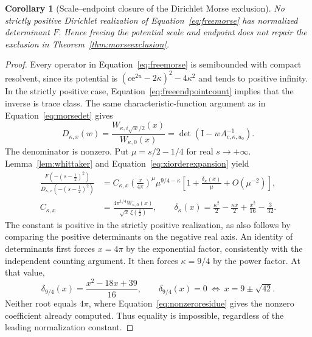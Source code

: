 \documentclass[11pt,letterpaper]{article}
\numberwithin{equation}{section}
\newtheorem{corollary}[theorem]{Corollary}
\theoremstyle{definition}
\theoremstyle{remark}
\newcommand{\Id}{\mathrm I}
\newcommand{\e}{\mathrm e}
\begin{document}
\begin{corollary}[Scale--endpoint closure of the Dirichlet Morse exclusion]
\label{cor:scaleendpointexclusion}
No strictly positive Dirichlet realization of Equation~\eqref{eq:freemorse} has normalized determinant $F$. Hence freeing the potential scale and endpoint does not repair the exclusion in Theorem~\ref{thm:morseexclusion}.
\end{corollary}
\begin{proof}
Every operator in Equation~\eqref{eq:freemorse} is semibounded with compact resolvent, since its potential is $(c\e^{2u}-2\kappa)^2-4\kappa^2$ and tends to positive infinity. In the strictly positive case, Equation~\eqref{eq:freeendpointcount} implies that the inverse is trace class. The same characteristic-function argument as in Equation~\eqref{eq:morsedet} gives
\begin{equation}
 D_{\kappa,x}(w)
 =\frac{W_{\kappa,i\sqrt w/2}(x)}{W_{\kappa,0}(x)}
 =\det(\Id-wA_{c,\kappa,u_0}^{-1}).
 \label{eq:freeendpointdet}
\end{equation}
The denominator is nonzero. Put $\mu=s/2-1/4$ for real $s\to+\infty$. Lemma~\ref{lem:whittaker} and Equation~\eqref{eq:xiorderexpansion} yield
\begin{align}
 \frac{F(-(s-\tfrac12)^2)}{D_{\kappa,x}(-(s-\tfrac12)^2)}
 &=C_{\kappa,x}
   \left(\frac{x}{4\pi}\right)^\mu
   \mu^{9/4-\kappa}
   \left[1+\frac{\delta_\kappa(x)}{\mu}+O(\mu^{-2})\right],
   \label{eq:freeendpointratio}\\
 C_{\kappa,x}&=\frac{4\pi^{1/4}W_{\kappa,0}(x)}{\sqrt x\,\xi(\tfrac12)},
   \qquad
 \delta_\kappa(x)=\frac{\kappa^2}{2}-\frac{\kappa x}{2}
                    +\frac{x^2}{16}-\frac3{32}.
   \label{eq:freeendpointconstants}
\end{align}
The constant is positive in the strictly positive realization, as also follows by comparing the positive determinants on the negative real axis. An identity of determinants first forces $x=4\pi$ by the exponential factor, consistently with the independent counting argument. It then forces $\kappa=9/4$ by the power factor. At that value,
\begin{equation}
 \delta_{9/4}(x)=\frac{x^2-18x+39}{16},\qquad
 \delta_{9/4}(x)=0\ \Longleftrightarrow\ x=9\pm\sqrt{42}.
 \label{eq:endpointroots}
\end{equation}
Neither root equals $4\pi$, where Equation~\eqref{eq:nonzeroresidue} gives the nonzero coefficient already computed. Thus equality is impossible, regardless of the leading normalization constant.
\end{proof}
\end{document}
